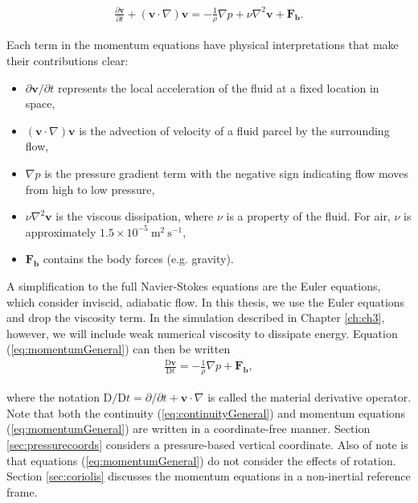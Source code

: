 \begin{align}
\frac{\partial \mathbf{v}}{\partial t} + (\mathbf{v} \cdot \nabla)\mathbf{v}  = -\frac{1}{\rho} \nabla p + \nu \nabla^2 \mathbf{v} + \mathbf{F_b}. \label{eq:momentumGeneral}
\end{align}

Each term in the momentum equations have physical interpretations that make their contributions clear:
\begin{itemize}
\item[] $\partial \mathbf{v}/\partial t$ represents the local acceleration of the fluid at a fixed location in space,

\item[] $(\mathbf{v} \cdot \nabla) \mathbf{v}$ is the advection of velocity of a fluid parcel by the surrounding flow,

\item[] $\nabla p$ is the pressure gradient term with the negative sign indicating flow moves from high to low pressure,

\item[] $\nu \nabla^2 \mathbf{v}$ is the viscous dissipation, where $\nu$ is a property of the fluid. For air, $\nu$ is approximately $1.5 \times 10^{-5}~ \text{m}^2~\text{s}^{-1}$,

\item[] $\mathbf{F_b}$ contains the body forces (e.g. gravity).
\end{itemize}

A simplification to the full Navier-Stokes equations are the Euler equations, which consider inviscid, adiabatic flow. In this thesis, we use the Euler equations and drop the viscosity term. In the simulation described in Chapter \ref{ch:ch3}, however, we will include weak numerical viscosity to dissipate energy. Equation (\ref{eq:momentumGeneral}) can then be written
\begin{align}
\frac{\text{D}\mathbf{v}}{\text{D}t}  = -\frac{1}{\rho} \nabla p + \mathbf{F_b} \label{eq:momentumEuler},
\end{align}

where the notation $\text{D}/\text{D}t = \partial/\partial t + \mathbf{v} \cdot \nabla$ is called the material derivative operator.\\

Note that both the continuity (\ref{eq:continuityGeneral}) and momentum equations (\ref{eq:momentumGeneral}) are written in a coordinate-free manner. Section \ref{sec:pressurecoords} considers a pressure-based vertical coordinate. Also of note is that equations (\ref{eq:momentumGeneral}) do not consider the effects of rotation. Section \ref{sec:coriolis} discusses the momentum equations in a non-inertial reference frame.

